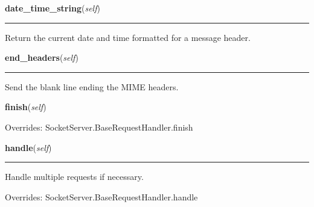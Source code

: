     \begin{boxedminipage}{\textwidth}

    \raggedright \textbf{date\_time\_string}(\textit{self})

    \vspace{-1.5ex}

    \rule{\textwidth}{0.5\fboxrule}
    Return the current date and time formatted for a message header.

    \vspace{1ex}

    \end{boxedminipage}

    \label{BaseHTTPServer:BaseHTTPRequestHandler:end_headers}

    \vspace{0.5ex}

    \begin{boxedminipage}{\textwidth}

    \raggedright \textbf{end\_headers}(\textit{self})

    \vspace{-1.5ex}

    \rule{\textwidth}{0.5\fboxrule}
    Send the blank line ending the MIME headers.

    \vspace{1ex}

    \end{boxedminipage}

    \vspace{0.5ex}

    \begin{boxedminipage}{\textwidth}

    \raggedright \textbf{finish}(\textit{self})

      Overrides: SocketServer.BaseRequestHandler.finish

    \end{boxedminipage}

    \vspace{0.5ex}

    \begin{boxedminipage}{\textwidth}

    \raggedright \textbf{handle}(\textit{self})

    \vspace{-1.5ex}

    \rule{\textwidth}{0.5\fboxrule}
    Handle multiple requests if necessary.

    \vspace{1ex}

      Overrides: SocketServer.BaseRequestHandler.handle

    \end{boxedminipage}

